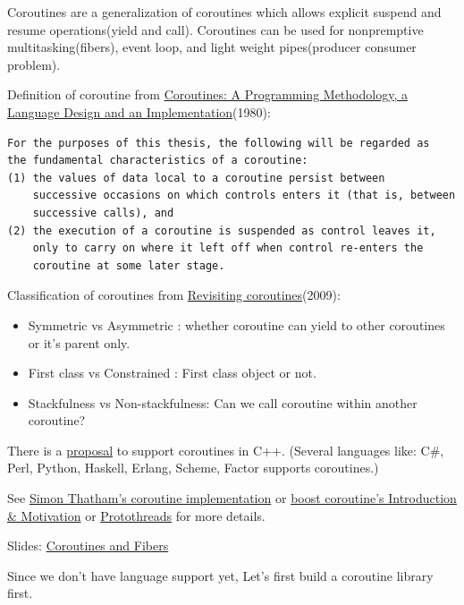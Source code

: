 \documentclass[]{book}
\begin{document}
Coroutines are a generalization of coroutines which allows explicit
suspend and resume operations(yield and call). Coroutines can be used
for nonpremptive multitasking(fibers), event loop, and light weight
pipes(producer consumer problem).

Definition of coroutine from
\href{http://books.google.co.in/books?id=bIAxhJor1EYC\&printsec=frontcover}{Coroutines:
A Programming Methodology, a Language Design and an
Implementation}(1980):

\begin{verbatim}
For the purposes of this thesis, the following will be regarded as
the fundamental characteristics of a coroutine:
(1) the values of data local to a coroutine persist between
    successive occasions on which controls enters it (that is, between
    successive calls), and
(2) the execution of a coroutine is suspended as control leaves it,
    only to carry on where it left off when control re-enters the
    coroutine at some later stage.
\end{verbatim}

Classification of coroutines from
\href{http://dl.acm.org/citation.cfm?id=1462167}{Revisiting
coroutines}(2009):

\begin{itemize}
\itemsep1pt\parskip0pt
\item
  Symmetric vs Asymmetric : whether coroutine can yield to other
  coroutines or it's parent only.
\item
  First class vs Constrained : First class object or not.
\item
  Stackfulness vs Non-stackfulness: Can we call coroutine within another
  coroutine?
\end{itemize}

There is a \href{http://isocpp.org/files/papers/n3985.pdf}{proposal} to
support coroutines in C++. (Several languages like: C\#, Perl, Python,
Haskell, Erlang, Scheme, Factor supports coroutines.)

See
\href{http://www.chiark.greenend.org.uk/~sgtatham/coroutines.html}{Simon
Thatham's coroutine implementation} or
\href{http://www.boost.org/doc/libs/1_57_0/libs/coroutine/doc/html/index.html}{boost
coroutine's Introduction \& Motivation} or
\href{http://dunkels.com/adam/pt/}{Protothreads} for more details.

Slides:
\href{http://www.open-std.org/jtc1/sc22/wg21/docs/papers/2014/n4287.pdf}{Coroutines
and Fibers}

Since we don't have language support yet, Let's first build a coroutine
library first.
\end{document}
